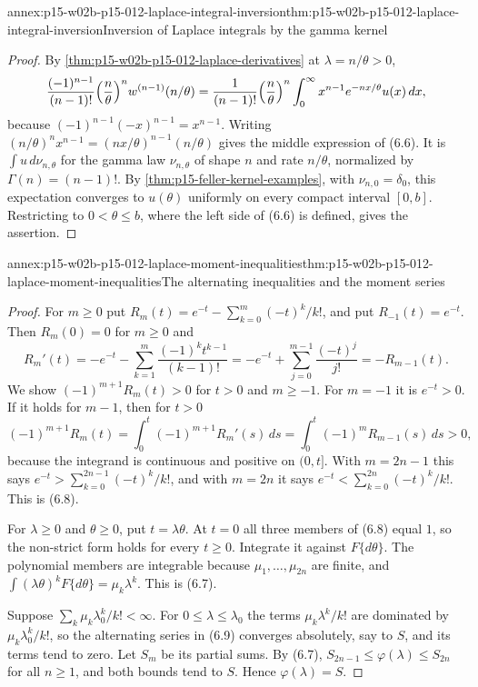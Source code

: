 \begin{annexitem}{annex:p15-w02b-p15-012-laplace-integral-inversion}{thm:p15-w02b-p15-012-laplace-integral-inversion}{Inversion of Laplace integrals by the gamma kernel}
\begin{proof}
By \cref{thm:p15-w02b-p15-012-laplace-derivatives} at \(\lambda=n/\theta>0\),
\[
 \frac{(-1)^{n-1}}{(n-1)!}\Bigl(\frac n\theta\Bigr)^nw^{(n-1)}(n/\theta)
   =\frac{1}{(n-1)!}\Bigl(\frac n\theta\Bigr)^n\int_0^\infty x^{n-1}e^{-nx/\theta}u(x)\,dx,
\]
because \((-1)^{n-1}(-x)^{n-1}=x^{n-1}\). Writing
\((n/\theta)^nx^{n-1}=(nx/\theta)^{n-1}(n/\theta)\) gives the middle expression
of (6.6). It is \(\int u\,d\nu_{n,\theta}\) for the gamma law
\(\nu_{n,\theta}\) of shape \(n\) and rate \(n/\theta\), normalized by
\(\Gamma(n)=(n-1)!\). By \cref{thm:p15-feller-kernel-examples}, with
\(\nu_{n,0}=\delta_0\), this expectation converges to \(u(\theta)\) uniformly
on every compact interval \([0,b]\). Restricting to \(0<\theta\leq b\), where
the left side of (6.6) is defined, gives the assertion.
\end{proof}
\end{annexitem}

\begin{annexitem}{annex:p15-w02b-p15-012-laplace-moment-inequalities}{thm:p15-w02b-p15-012-laplace-moment-inequalities}{The alternating inequalities and the moment series}
\begin{proof}
For \(m\geq0\) put \(R_m(t)=e^{-t}-\sum_{k=0}^m(-t)^k/k!\), and put
\(R_{-1}(t)=e^{-t}\). Then \(R_m(0)=0\) for \(m\geq0\) and
\[
 R_m'(t)=-e^{-t}-\sum_{k=1}^m\frac{(-1)^kt^{k-1}}{(k-1)!}
       =-e^{-t}+\sum_{j=0}^{m-1}\frac{(-t)^j}{j!}=-R_{m-1}(t).
\]
We show \((-1)^{m+1}R_m(t)>0\) for \(t>0\) and \(m\geq-1\). For \(m=-1\) it
is \(e^{-t}>0\). If it holds for \(m-1\), then for \(t>0\)
\[
 (-1)^{m+1}R_m(t)=\int_0^t(-1)^{m+1}R_m'(s)\,ds
   =\int_0^t(-1)^mR_{m-1}(s)\,ds>0,
\]
because the integrand is continuous and positive on \((0,t]\). With
\(m=2n-1\) this says \(e^{-t}>\sum_{k=0}^{2n-1}(-t)^k/k!\), and with
\(m=2n\) it says \(e^{-t}<\sum_{k=0}^{2n}(-t)^k/k!\). This is (6.8).

For \(\lambda\geq0\) and \(\theta\geq0\), put \(t=\lambda\theta\). At
\(t=0\) all three members of (6.8) equal \(1\), so the non-strict form holds
for every \(t\geq0\). Integrate it against \(F\{d\theta\}\). The polynomial
members are integrable because \(\mu_1,\ldots,\mu_{2n}\) are finite, and
\(\int(\lambda\theta)^kF\{d\theta\}=\mu_k\lambda^k\). This is (6.7).

Suppose \(\sum_k\mu_k\lambda_0^k/k!<\infty\). For \(0\leq\lambda\leq\lambda_0\)
the terms \(\mu_k\lambda^k/k!\) are dominated by \(\mu_k\lambda_0^k/k!\), so
the alternating series in (6.9) converges absolutely, say to \(S\), and its
terms tend to zero. Let \(S_m\) be its partial sums. By (6.7),
\(S_{2n-1}\leq\varphi(\lambda)\leq S_{2n}\) for all \(n\geq1\), and both
bounds tend to \(S\). Hence \(\varphi(\lambda)=S\).
\end{proof}
\end{annexitem}

